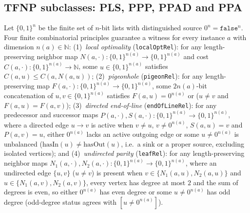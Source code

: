 \begin{result}
\subsection{TFNP subclasses: PLS, PPP, PPAD and PPA}
Let $\{0,1\}^n$ be the finite set of $n$-bit lists with distinguished source
$0^n=\mathtt{false}^n$. Four finite combinatorial principles guarantee a
witness for every instance $a$ with dimension $n(a)\in\mathbb N$:
(1)~\emph{local optimality} (\texttt{localOptRel}): for any length-preserving
neighbor map $N(a,\cdot):\{0,1\}^{n(a)}\to\{0,1\}^{n(a)}$ and cost
$C(a,\cdot):\{0,1\}^{n(a)}\to\mathbb N$, some $u\in\{0,1\}^{n(a)}$ satisfies
$C(a,u)\le C(a,N(a,u))$;
(2)~\emph{pigeonhole} (\texttt{pigeonRel}): for any length-preserving map
$F(a,\cdot):\{0,1\}^{n(a)}\to\{0,1\}^{n(a)}$, some $2n(a)$-bit concatenation
of $u,v\in\{0,1\}^{n(a)}$ satisfies $F(a,u)=0^{n(a)}$ or
($u\ne v$ and $F(a,u)=F(a,v)$);
(3)~\emph{directed end-of-line} (\texttt{endOfLineRel}): for any predecessor
and successor maps $P(a,\cdot),S(a,\cdot):\{0,1\}^{n(a)}\to\{0,1\}^{n(a)}$,
where a directed edge $u\to v$ is active when $v\ne u$, $v\ne 0^{n(a)}$,
$S(a,u)=v$ and $P(a,v)=u$, either $0^{n(a)}$ lacks an active outgoing edge or
some $u\ne 0^{n(a)}$ is unbalanced ($\mathrm{hasIn}(u)\ne\mathrm{hasOut}(u)$,
i.e.\ a sink or a proper source, excluding isolated vertices); and
(4)~\emph{undirected parity} (\texttt{leafRel}): for any length-preserving
neighbor maps $N_1(a,\cdot),N_2(a,\cdot):\{0,1\}^{n(a)}\to\{0,1\}^{n(a)}$,
where an undirected edge $\{u,v\}$ ($u\ne v$) is present when
$v\in\{N_1(a,u),N_2(a,u)\}$ and $u\in\{N_1(a,v),N_2(a,v)\}$, every vertex has
degree at most $2$ and the sum of degrees is even, so either $0^{n(a)}$ has
even degree or some $u\ne 0^{n(a)}$ has odd degree (odd-degree status agrees
with $[u\ne 0^{n(a)}]$).


\end{result}

